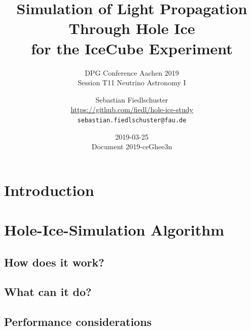 \documentclass[green, 12pt]{beamer}
\title[Simulation of Light Propagation Through Hole Ice, IceCube, DPG Aachen 2019-03-25]{Simulation of Light Propagation Through Hole Ice\\for the IceCube Experiment}
\subtitle{DPG Conference Aachen 2019\\Session T11 Neutrino Astronomy I}
\date{2019-03-25 \\ \vspace*{2mm} \tiny{Document 2019-ceGhee3n} \normalsize}
\author[Sebastian Fiedlschuster, ECAP Erlangen]{Sebastian Fiedlschuster \\ \tiny{\url{https://github.com/fiedl/hole-ice-study}} \\ \tiny\texttt{sebastian.fiedlschuster@fau.de}}
\institute{Erlangen Centre for Astroparticle Physics}
\newif\ifplacelogo %
\begin{document}



\placelogofalse

\section{Introduction}
  
  
  

\section{Hole-Ice-Simulation Algorithm}
\subsection{How does it work?}
  
\subsection{What can it do?}
  
  
  
  
  
  

\subsection{Performance considerations}
  
  

%   
%   
%   
%   
%   
%   
%   
\end{document}
